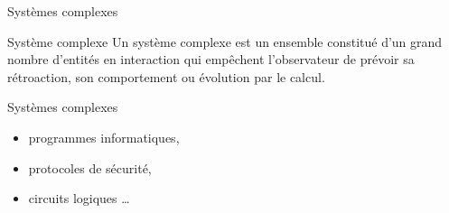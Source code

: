 \begin{frame}{Systèmes complexes}
  \begin{block}{Système complexe}
    Un système complexe est un ensemble constitué d'un grand nombre d'entités en interaction qui empêchent l'observateur de prévoir sa rétroaction, son comportement ou évolution par le calcul.
  \end{block}
  \pause
  \begin{exampleblock}{Systèmes complexes}
    \begin{itemize}
    \item programmes informatiques,
    \item protocoles de sécurité,
    \item circuits logiques \ldots
    \end{itemize}
  \end{exampleblock}
\end{frame}


